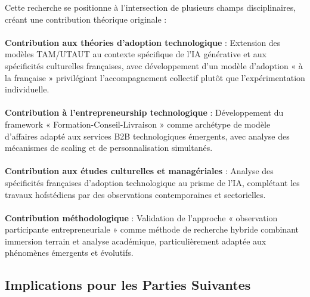 Cette recherche se positionne à l'intersection de plusieurs champs disciplinaires, créant une contribution théorique originale :
\\\\
\textbf{Contribution aux théories d'adoption technologique} : Extension des modèles TAM/UTAUT au contexte spécifique de l'IA générative et aux spécificités culturelles françaises, avec développement d'un modèle d'adoption « à la française » privilégiant l'accompagnement collectif plutôt que l'expérimentation individuelle.
\\\\
\textbf{Contribution à l'entrepreneurship technologique} : Développement du framework « Formation-Conseil-Livraison » comme archétype de modèle d'affaires adapté aux services B2B technologiques émergents, avec analyse des mécanismes de scaling et de personnalisation simultanés.
\\\\
\textbf{Contribution aux études culturelles et managériales} : Analyse des spécificités françaises d'adoption technologique au prisme de l'IA, complétant les travaux hofstédiens par des observations contemporaines et sectorielles.
\\\\
\textbf{Contribution méthodologique} : Validation de l'approche « observation participante entrepreneuriale » comme méthode de recherche hybride combinant immersion terrain et analyse académique, particulièrement adaptée aux phénomènes émergents et évolutifs.

\subsection{Implications pour les Parties Suivantes}

